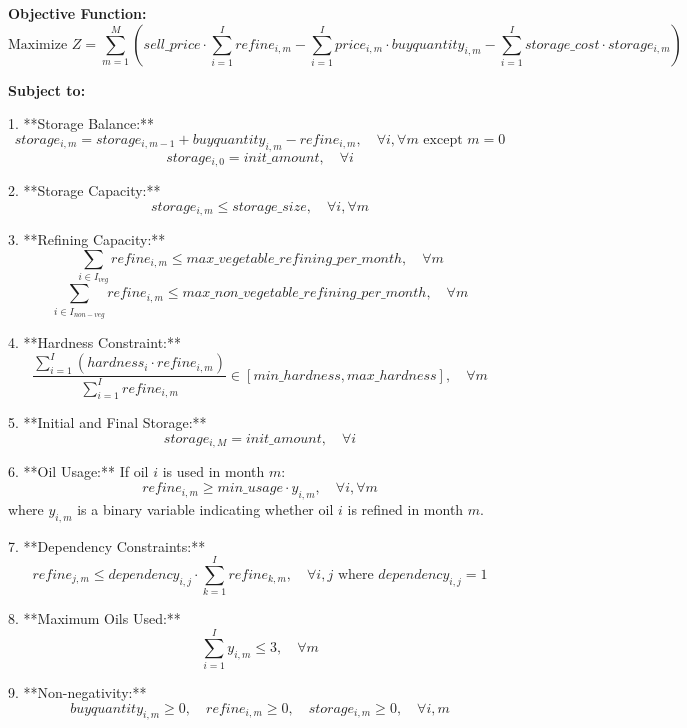 \documentclass{article}
\begin{document}
\textbf{Objective Function:}
\[
\text{Maximize } Z = \sum_{m=1}^{M} \left( sell\_price \cdot \sum_{i=1}^{I} refine_{i,m} - \sum_{i=1}^{I} price_{i,m} \cdot buyquantity_{i,m} - \sum_{i=1}^{I} storage\_cost \cdot storage_{i,m} \right)
\]

\textbf{Subject to:}

1. **Storage Balance:**
   \[
   storage_{i,m} = storage_{i,m-1} + buyquantity_{i,m} - refine_{i,m}, \quad \forall i, \forall m \text{ except } m=0
   \]
   \[
   storage_{i,0} = init\_amount, \quad \forall i
   \]

2. **Storage Capacity:**
   \[
   storage_{i,m} \leq storage\_size, \quad \forall i, \forall m
   \]

3. **Refining Capacity:**
   \[
   \sum_{i \in I_{veg}} refine_{i,m} \leq max\_vegetable\_refining\_per\_month, \quad \forall m
   \]
   \[
   \sum_{i \in I_{non-veg}} refine_{i,m} \leq max\_non\_vegetable\_refining\_per\_month, \quad \forall m
   \]

4. **Hardness Constraint:**
   \[
   \frac{\sum_{i=1}^{I} (hardness_{i} \cdot refine_{i,m})}{\sum_{i=1}^{I} refine_{i,m}} \in [min\_hardness, max\_hardness], \quad \forall m
   \]

5. **Initial and Final Storage:**
   \[
   storage_{i,M} = init\_amount, \quad \forall i
   \]

6. **Oil Usage:**
   If oil $i$ is used in month $m$:
   \[
   refine_{i,m} \geq min\_usage \cdot y_{i,m}, \quad \forall i, \forall m
   \]
   where $y_{i,m}$ is a binary variable indicating whether oil $i$ is refined in month $m$.

7. **Dependency Constraints:**
   \[
   refine_{j,m} \leq dependency_{i,j} \cdot \sum_{k=1}^{I} refine_{k,m}, \quad \forall i, j \text{ where } dependency_{i,j} = 1
   \]

8. **Maximum Oils Used:**
   \[
   \sum_{i=1}^{I} y_{i,m} \leq 3, \quad \forall m
   \]

9. **Non-negativity:**
   \[
   buyquantity_{i,m} \geq 0, \quad refine_{i,m} \geq 0, \quad storage_{i,m} \geq 0, \quad \forall i, m
   \]
\end{document}
